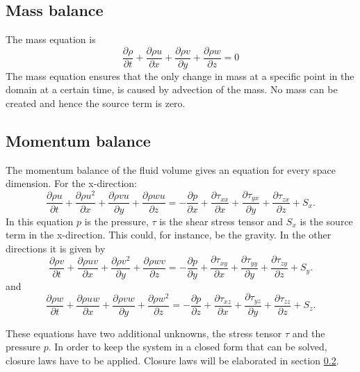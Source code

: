 \documentclass{report}
\newcommand{\dt}[1]{\frac{\partial #1}{\partial t}}
\newcommand{\dx}[1]{\frac{\partial #1}{\partial x}}
\newcommand{\dy}[1]{\frac{\partial #1}{\partial y}}
\newcommand{\dz}[1]{\frac{\partial #1}{\partial z}}
\begin{document}
\subsection{Mass balance}
The mass equation is
\begin{equation}
\label{e:mass_balance}
\dt{\rho} + \dx{\rho u} + \dy{\rho v} + \dz{\rho w} = 0
\end{equation}
The mass equation ensures that the only change in mass at a specific point in the domain at a certain time, is caused by advection of the mass. No mass can be created and hence the source term is zero.

\subsection{Momentum balance}
The momentum balance of the fluid volume gives an equation for every space dimension.
For the x-direction:
\begin{equation}
\label{e:momentumBalance_X}
\dt{\rho u} + \dx{\rho u^2} + \dy{\rho v u} + \dz{\rho w u} =
-\dx{p} + \dx{\tau_{xx}} + \dy{\tau_{yx}} + \dz{\tau_{zx}} + S_x.
\end{equation}
In this equation $p$ is the pressure, $\tau$ is the shear stress tensor and $S_x$ is the source term in the x-direction. This could, for instance, be the gravity.
In the other directions it is given by
\begin{equation}
\label{e:momentumBalance_Y}
\dt{\rho v} + \dx{\rho u v} + \dy{\rho v^2} + \dz{\rho w v} =
-\dy{p} + \dx{\tau_{xy}} + \dy{\tau_{yy}} + \dz{\tau_{zy}} + S_y.
\end{equation}
and
\begin{equation}
\label{e:momentumBalance_Z}
\dt{\rho w} + \dx{\rho u w} + \dy{\rho v w} + \dz{\rho w^2} =
-\dz{p} + \dx{\tau_{xz}} + \dy{\tau_{yz}} + \dz{\tau_{zz}} + S_z.
\end{equation}

These equations have two additional unknowns, the stress tensor $\tau$ and the pressure $p$. In order to keep the system in a closed form that can be solved, closure laws have to be applied. Closure laws will be elaborated in section \ref{}.
\end{document}
